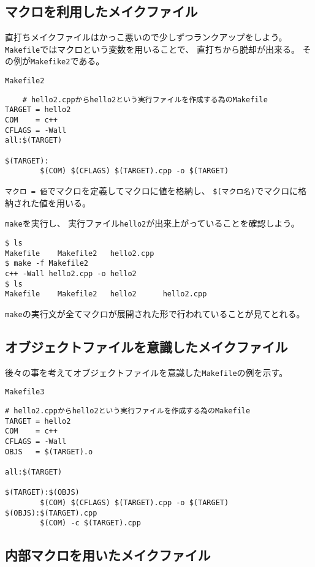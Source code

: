 \clearpage
 \subsection{マクロを利用したメイクファイル}
 直打ちメイクファイルはかっこ悪いので少しずつランクアップをしよう。
 \texttt{Makefile}ではマクロという変数を用いることで、
 直打ちから脱却が出来る。
 その例が\texttt{Makefike2}である。
\begin{itembox}{\texttt{Makefile2}}
 \begin{verbatim}
	# hello2.cppからhello2という実行ファイルを作成する為のMakefile
TARGET = hello2
COM    = c++
CFLAGS = -Wall
all:$(TARGET)

$(TARGET):
        $(COM) $(CFLAGS) $(TARGET).cpp -o $(TARGET)
 \end{verbatim}
\end{itembox}
\texttt{マクロ = 値}でマクロを定義してマクロに値を格納し、
\texttt{\$(マクロ名)}でマクロに格納された値を用いる。

\verb|make|を実行し、
実行ファイル\texttt{hello2}が出来上がっていることを確認しよう。
\begin{verbatim}
$ ls
Makefile	Makefile2	hello2.cpp
$ make -f Makefile2
c++ -Wall hello2.cpp -o hello2
$ ls
Makefile	Makefile2	hello2		hello2.cpp
\end{verbatim}
\verb|make|の実行文が全てマクロが展開された形で行われていることが見てとれる。


\subsection{オブジェクトファイルを意識したメイクファイル}

後々の事を考えてオブジェクトファイルを意識した\texttt{Makefile}の例を示す。
\begin{itembox}{\texttt{Makefile3}}
\begin{verbatim}
# hello2.cppからhello2という実行ファイルを作成する為のMakefile
TARGET = hello2
COM    = c++
CFLAGS = -Wall
OBJS   = $(TARGET).o

all:$(TARGET)

$(TARGET):$(OBJS)
        $(COM) $(CFLAGS) $(TARGET).cpp -o $(TARGET)
$(OBJS):$(TARGET).cpp
        $(COM) -c $(TARGET).cpp
\end{verbatim}
\end{itembox}

\subsection{内部マクロを用いたメイクファイル}

